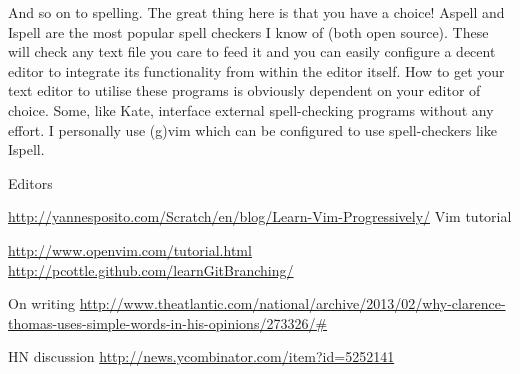 And so on to spelling. The great thing here is that you have a choice! Aspell and Ispell are the most popular spell checkers I know of (both open source). These will check any text file you care to feed it and you can easily configure a decent editor to integrate its functionality from within the editor itself. How to get your text editor to utilise these programs is obviously dependent on your editor of choice. Some, like Kate, interface external spell-checking programs without any effort. I personally use (g)vim which can be configured to use spell-checkers like Ispell.

Editors

\url{http://yannesposito.com/Scratch/en/blog/Learn-Vim-Progressively/}
Vim tutorial

\url{http://www.openvim.com/tutorial.html}
\url{http://pcottle.github.com/learnGitBranching/}

On writing \url{http://www.theatlantic.com/national/archive/2013/02/why-clarence-thomas-uses-simple-words-in-his-opinions/273326/#}

HN discussion \url{http://news.ycombinator.com/item?id=5252141}










